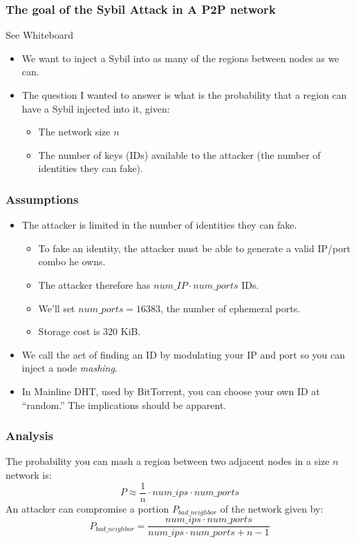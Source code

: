\documentclass[11pt]{beamer}
\begin{document}
\begin{frame}
	\frametitle{The goal of the Sybil Attack in A P2P network}
	See Whiteboard
	\begin{itemize}
		\item We want to inject a Sybil into as many of the regions between nodes as we can.
		\item The question I wanted to answer is what is the probability that a region can have a Sybil injected into it, given:
		\begin{itemize}
			\item The network size $n$
			\item The number of keys (IDs) available to the attacker (the number of identities they can fake).
		\end{itemize}
	\end{itemize}
	\end{frame} 
       
\begin{frame}
\frametitle{Assumptions}
	\begin{itemize}
		\item The attacker is limited in the number of identities they can fake.
		
		\begin{itemize}
			\item To fake an identity, the attacker must be able to generate a valid IP/port combo he owns.
			\item The attacker therefore has $num\_IP \cdot num\_ports$ IDs.
			\item We'll set $ num\_ports = 16383 $, the number of ephemeral ports.
			\item Storage cost is 320 KiB.
		\end{itemize}
		\item We call the act of finding an ID by modulating your IP and port so you can inject a node \emph{mashing}.
		\item In Mainline DHT, used by BitTorrent, you can choose your own ID at ``random.''   The implications should be apparent.
	
	\end{itemize}
\end{frame}

\begin{frame}
    \frametitle{Analysis}
    The probability you can mash a region between two adjacent nodes in a size $n$ network is:
     \begin{equation}
    P \approx \frac{1}{n}\cdot num\_ips \cdot num\_ports
    \end{equation}
    An attacker can compromise a portion $ P_{bad\_neighbor} $ of the network given by:
    \begin{equation}
    P_{bad\_neighbor} =  \frac{num\_ips \cdot num\_ports}{num\_ips \cdot num\_ports + n - 1}
    \label{eq:bad}
    \end{equation}
    
\end{frame}
\end{document}
